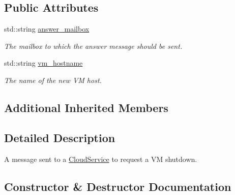 \subsection*{Public Attributes}
\begin{DoxyCompactItemize}
\item 
\mbox{\label{classwrench_1_1_cloud_service_shutdown_v_m_request_message_af79c7ae3a239735ac51b86a8789d17e3}} 
std\+::string \hyperlink{classwrench_1_1_cloud_service_shutdown_v_m_request_message_af79c7ae3a239735ac51b86a8789d17e3}{answer\+\_\+mailbox}
\begin{DoxyCompactList}\small\item\em The mailbox to which the answer message should be sent. \end{DoxyCompactList}\item 
\mbox{\label{classwrench_1_1_cloud_service_shutdown_v_m_request_message_a8c7a69388cd9451095a2e1aa96dc4fdb}} 
std\+::string \hyperlink{classwrench_1_1_cloud_service_shutdown_v_m_request_message_a8c7a69388cd9451095a2e1aa96dc4fdb}{vm\+\_\+hostname}
\begin{DoxyCompactList}\small\item\em The name of the new VM host. \end{DoxyCompactList}\end{DoxyCompactItemize}
\subsection*{Additional Inherited Members}


\subsection{Detailed Description}
A message sent to a \hyperlink{classwrench_1_1_cloud_service}{Cloud\+Service} to request a VM shutdown. 

\subsection{Constructor \& Destructor Documentation}
\mbox{\label{classwrench_1_1_cloud_service_shutdown_v_m_request_message_aaab0418486b262131e7a73fa0ef21d8e}} 
